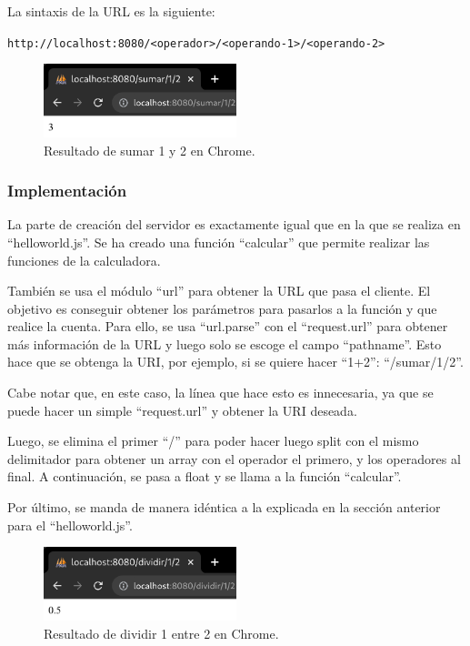 \documentclass{article}
\begin{document}
La sintaxis de la URL es la siguiente: 

\verb|http://localhost:8080/<operador>/<operando-1>/<operando-2>|

\bigskip

\begin{figure}[H]
    \centering
    \includegraphics[width=0.5\textwidth]{images/rescalcnormal.png}
    \caption{Resultado de sumar 1 y 2 en Chrome.}
\end{figure}

\subsubsection{Implementación}
La parte de creación del servidor es exactamente igual que en la que se realiza en ``helloworld.js''. Se ha creado una función ``calcular'' que permite realizar las funciones de la calculadora.

\bigskip

También se usa el módulo ``url'' para obtener la URL que pasa el cliente. El objetivo es conseguir obtener los parámetros para pasarlos a la función y que realice la cuenta. Para ello, se usa ``url.parse'' con el ``request.url'' para obtener más información de la URL y luego solo se escoge el campo ``pathname''. Esto hace que se obtenga la URI, por ejemplo, si se quiere hacer ``1+2'': ``/sumar/1/2''.

Cabe notar que, en este caso, la línea que hace esto es innecesaria, ya que se puede hacer un simple ``request.url'' y obtener la URI deseada.

\bigskip

Luego, se elimina el primer ``/'' para poder hacer luego split con el mismo delimitador para obtener un array con el operador el primero, y los operadores al final. A continuación, se pasa a float y se llama a la función ``calcular''.

\bigskip

Por último, se manda de manera idéntica a la explicada en la sección anterior para el ``helloworld.js''.

\begin{figure}[H]
    \centering
    \includegraphics[width=0.5\textwidth]{images/dividircnormal.png}
    \caption{Resultado de dividir 1 entre 2 en Chrome.}
\end{figure}
\end{document}
